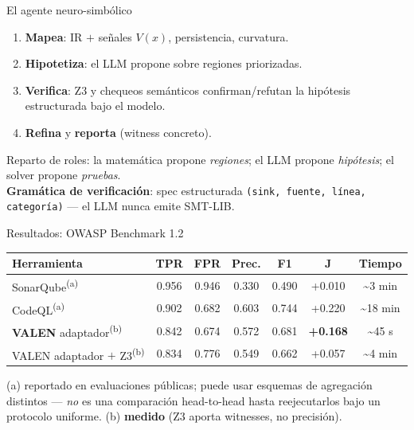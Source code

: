 \documentclass[aspectratio=169,11pt]{beamer}
\begin{document}
\begin{frame}[fragile]{El agente neuro-simbólico}
  \begin{enumerate}
    \item \textbf{Mapea}: IR $+$ señales $V(x)$, persistencia, curvatura.
    \item \textbf{Hipotetiza}: el LLM propone sobre regiones priorizadas.
    \item \textbf{Verifica}: Z3 y chequeos semánticos confirman/refutan la hipótesis estructurada bajo el modelo.
    \item \textbf{Refina} y \textbf{reporta} (witness concreto).
  \end{enumerate}
  \vspace{2mm}
  Reparto de roles: la matemática propone \emph{regiones}; el LLM propone
  \emph{hipótesis}; el solver propone \emph{pruebas}. \\[1mm]
  \textbf{Gramática de verificación}: spec estructurada
  \texttt{(sink, fuente, línea, categoría)} --- el LLM nunca emite SMT-LIB.
\end{frame}

\begin{frame}{Resultados: OWASP Benchmark 1.2}
  \begin{center}
  \small
  \begin{tabular}{lcccccc}
  \toprule
  \textbf{Herramienta} & \textbf{TPR} & \textbf{FPR} & \textbf{Prec.} & \textbf{F1} & \textbf{J} & \textbf{Tiempo} \\
  \midrule
  SonarQube\textsuperscript{(a)} & 0.956 & 0.946 & 0.330 & 0.490 & +0.010 & \textasciitilde3 min \\
  CodeQL\textsuperscript{(a)} & 0.902 & 0.682 & 0.603 & 0.744 & +0.220 & \textasciitilde18 min \\
  \textbf{VALEN} adaptador\textsuperscript{(b)} & 0.842 & 0.674 & 0.572 & 0.681 & \textbf{+0.168} & \textasciitilde45 s \\
  VALEN adaptador $+$ Z3\textsuperscript{(b)} & 0.834 & 0.776 & 0.549 & 0.662 & +0.057 & \textasciitilde4 min \\
  \bottomrule
  \end{tabular}
  \end{center}

  \vspace{1mm}
  {\footnotesize (a) reportado en evaluaciones públicas; puede usar esquemas de
  agregación distintos --- \emph{no} es una comparación head-to-head hasta reejecutarlos
  bajo un protocolo uniforme. (b) \textbf{medido} (Z3 aporta witnesses, no precisión).}
\end{frame}
\end{document}
